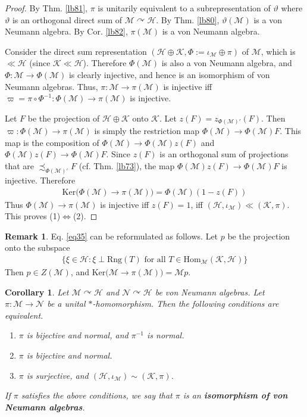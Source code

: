 \documentclass[12pt,b5paper,notitlepage]{article}
\theoremstyle{definition}
\newtheorem{rem}[df]{Remark}
\theoremstyle{plain}
\newtheorem{co}[df]{Corollary}
\newcommand{\mc}{\mathcal}
\newcommand{\Hom}{\mathrm{Hom}}
\newcommand{\Ker}{\mathrm{Ker}}
\newcommand{\Rng}{\mathrm{Rng}}
\numberwithin{equation}{section}
\begin{document}
\begin{proof}
By Thm. \ref{lb81}, $\pi$ is unitarily equivalent to a subrepresentation of $\vartheta$ where $\vartheta$ is an orthogonal direct sum of $\mc M\curvearrowright\mc H$. By Thm. \ref{lb80}, $\vartheta(\mc M)$ is a von Neumann algebra. By Cor. \ref{lb82}, $\pi(\mc M)$ is a von Neumann algebra.

Consider the direct sum representation $(\mc H\oplus\mc K,\Phi:=\iota_{\mc M}\oplus\pi)$ of $\mc M$, which is $\ll\mc H$ (since $\mc K\ll\mc H$). Therefore $\Phi(\mc M)$ is also a von Neumann algebra, and $\Phi:\mc M\rightarrow\Phi(\mc M)$ is clearly injective, and hence is an isomorphism of von Neumann algebras. Thus, $\pi:\mc M\rightarrow\pi(\mc M)$ is injective iff $\varpi=\pi\circ\Phi^{-1}:\Phi(\mc M)\rightarrow\pi(\mc M)$ is injective. 

Let $F$ be the projection of $\mc H\oplus\mc K$ onto $\mc K$. Let $z(F)=z_{\Phi(\mc M)'}(F)$. Then $\varpi:\Phi(\mc M)\rightarrow\pi(\mc M)$ is simply the restriction map $\Phi(\mc M)\rightarrow\Phi(\mc M)F$. This map is the composition of $\Phi(\mc M)\rightarrow\Phi(\mc M)z(F)$ and $\Phi(\mc M)z(F)\rightarrow\Phi(\mc M)F$. Since $z(F)$ is an orthogonal sum of projections that are $\precsim_{\Phi(\mc M)'} F$ (cf. Thm. \ref{lb73}), the map $\Phi(\mc M)z(F)\rightarrow\Phi(\mc M)F$ is injective. Therefore
\begin{align}\label{eq35}
\Ker\big(\Phi(\mc M)\rightarrow \pi(\mc M) \big)=\Phi(\mc M)(1-z(F))
\end{align}
Thus $\Phi(\mc M)\rightarrow \pi(\mc M)$ is injective iff $z(F)=1$, iff $(\mc H,\iota_{\mc M})\ll(\mc K,\pi)$. This proves (1)$\Leftrightarrow$(2).
\end{proof}


\begin{rem}
Eq. \eqref{eq35} can be reformulated as follows. Let $p$ be the projection onto the subspace
\begin{align*}
\{\xi\in\mc H:\xi\perp\Rng(T)\text{ for all }T\in\Hom_{\mc M}(\mc K,\mc H)  \}
\end{align*}
Then $p\in Z(\mc M)$, and $\Ker\big(\mc M\rightarrow\pi(\mc M)\big)=\mc Mp$. 
\end{rem}



\begin{co}\label{lb101}
Let $\mc M\curvearrowright\mc H$ and $\mc N\curvearrowright\mc H$ be von Neumann algebras. Let $\pi:\mc M\rightarrow\mc N$ be a unital $*$-homomorphism. Then the following conditions are equivalent.
\begin{enumerate}[label=(\arabic*)]
\item $\pi$ is bijective and normal, and $\pi^{-1}$ is normal.
\item $\pi$ is bijective and normal.
\item $\pi$ is surjective, and $(\mc H,\iota_{\mc M})\sim(\mc K,\pi)$.
\end{enumerate}
If $\pi$ satisfies the above conditions, we say that $\pi$ is an \textbf{isomorphism of von Neumann algebras}.
\end{co}
\end{document}
